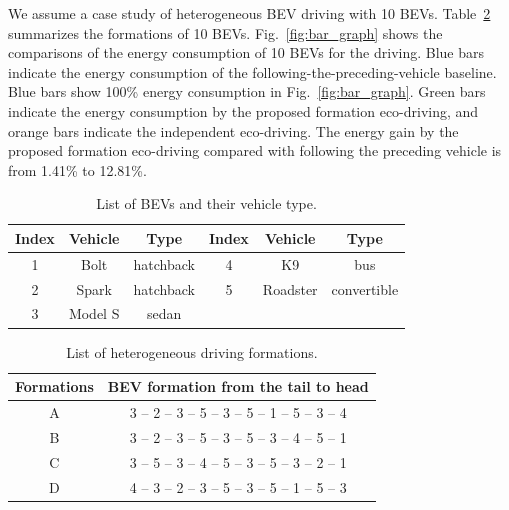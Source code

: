 \documentclass{IEEEtran}
\begin{document}
We assume a case study of heterogeneous BEV driving with 10 BEVs. Table~\ref{table:list_formation} summarizes the formations of 10 BEVs. 
Fig.~\ref{fig:bar_graph} shows the comparisons of the energy consumption of 10 BEVs for the driving. Blue bars indicate the energy consumption of the  following-the-preceding-vehicle baseline. Blue bars show 100\% energy consumption in Fig.~\ref{fig:bar_graph}. Green bars indicate the energy consumption by the proposed formation eco-driving, and orange bars indicate the independent eco-driving.
The energy gain by the proposed formation eco-driving compared with following the preceding vehicle is from 1.41\% to 12.81\%. 


\begin{table} 	%
\centering
\small
\caption{List of BEVs and their vehicle type.}
\label{table:list_EVs}
\begin{tabular}{|c|c|c|c|c|c|} \hline
Index	&Vehicle	&Type		&Index	&Vehicle	&Type 	\\ \hline
1		&Bolt	&hatchback	&4		&K9		&bus			\\ \hline	
2		&Spark	&hatchback	&5		&Roadster&convertible 	\\ \hline
3		&Model S	&sedan	\\ \cline{1-3}
\end{tabular}
\end{table}



\begin{table} 	%
\centering
\small
\caption{List of heterogeneous driving formations.}
\label{table:list_formation}
\begin{tabular}{|c|c|} \hline
Formations	& BEV formation from the tail to head	\\ \hline
A	&3 -- 2 -- 3 -- 5 -- 3 -- 5 -- 1 -- 5 -- 3 -- 4	\\ \hline
B	&3 -- 2 -- 3 -- 5 -- 3 -- 5 -- 3 -- 4 -- 5 -- 1	\\ \hline
C	&3 -- 5 -- 3 -- 4 -- 5 -- 3 -- 5 -- 3 -- 2 -- 1	\\ \hline
D	&4 -- 3 -- 2 -- 3 -- 5 -- 3 -- 5 -- 1 -- 5 -- 3	\\ \hline
\end{tabular}
\end{table}
\end{document}
